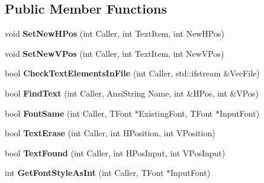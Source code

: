 \subsection*{Public Member Functions}
\begin{DoxyCompactItemize}
\item 
\mbox{\label{class_t_text_handler_af766ce44ed9a37e5a723a4ef3968ace0}} 
void {\bfseries Set\+New\+H\+Pos} (int Caller, int Text\+Item, int New\+H\+Pos)
\item 
\mbox{\label{class_t_text_handler_a65f0033d036358a5cb2ec5f4732e64ee}} 
void {\bfseries Set\+New\+V\+Pos} (int Caller, int Text\+Item, int New\+V\+Pos)
\item 
\mbox{\label{class_t_text_handler_a9b78e10ef2f0907a845c0d8ed7ccdede}} 
bool {\bfseries Check\+Text\+Elements\+In\+File} (int Caller, std\+::ifstream \&Vec\+File)
\item 
\mbox{\label{class_t_text_handler_a0fb5dca23fd07e642c611381b6344746}} 
bool {\bfseries Find\+Text} (int Caller, Ansi\+String Name, int \&H\+Pos, int \&V\+Pos)
\item 
\mbox{\label{class_t_text_handler_a316bc0c1c06d77aa8c33a668946e49f1}} 
bool {\bfseries Font\+Same} (int Caller, T\+Font $\ast$Existing\+Font, T\+Font $\ast$Input\+Font)
\item 
\mbox{\label{class_t_text_handler_ad606b1b745b674f0a46cdaa65d09206d}} 
bool {\bfseries Text\+Erase} (int Caller, int H\+Position, int V\+Position)
\item 
\mbox{\label{class_t_text_handler_a2395c6412e763e1b1141b6dc1d524f8b}} 
bool {\bfseries Text\+Found} (int Caller, int H\+Pos\+Input, int V\+Pos\+Input)
\item 
\mbox{\label{class_t_text_handler_a19a5042d87a979d56ba4678bee8b2abb}} 
int {\bfseries Get\+Font\+Style\+As\+Int} (int Caller, T\+Font $\ast$Input\+Font)
\item 
\mbox{\label{class_t_text_handler_a7fa848c67afecfa5fd33d7fee4ab805b}} 

\end{DoxyCompactItemize}
